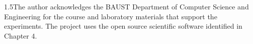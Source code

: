 \begin{spacing}{1.5}The author acknowledges the BAUST Department of Computer Science and Engineering for the course and laboratory materials that support the experiments. The project uses the open source scientific software identified in Chapter 4.\end{spacing}